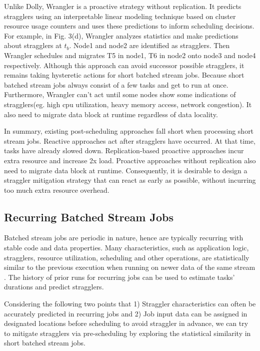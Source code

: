   Unlike Dolly, Wrangler \cite{Yadwadkar2014} is a proactive strategy without replication. It predicts stragglers using an interpretable linear modeling technique based on cluster resource usage counters and uses these predictions to inform scheduling decisions. For example, in Fig. 3(d), Wrangler analyzes statistics and make predictions about stragglers at $t_b$. Node1 and node2 are identified as stragglers. Then Wrangler schedules and migrates T5 in node1, T6 in node2 onto node3 and node4 respectively. Although this approach can avoid successor possible stragglers, it remains taking hysteretic actions for short batched stream jobs. Because short batched stream jobs always consist of a few tasks and get to run at once. Furthermore, Wrangler can't act until some nodes show some indications of stragglers(eg. high cpu utilization, heavy memory access, network congestion). It also need to migrate data block at runtime regardless of data locality.

  In summary, existing post-scheduling approaches fall short when processing short stream jobs. Reactive approaches act after stragglers have occurred. At that time, tasks have already slowed down. Replication-based proactive approaches incur extra resource and increase 2x load. Proactive approaches without replication also need to migrate data block at runtime. Consequently, it is desirable to design a straggler mitigation strategy that can react as early as possible, without incurring too much extra resource overhead.

\subsection{Recurring Batched Stream Jobs}

  Batched stream jobs are periodic in nature, hence are typically recurring with stable code and data properties. Many characteristics, such as application logic, stragglers, resource utilization, scheduling and other operations, are statistically similar to the previous execution when running on newer data of the same stream \cite{Agarwal} \cite{Grandl2016} \cite{Jyothi2016}. The history of prior runs for recurring jobs can be used to estimate tasks' durations and predict stragglers.

  Considering the following two points that 1) Straggler characteristics can often be accurately predicted in recurring jobs and 2) Job input data can be assigned in designated locations before scheduling to avoid straggler in advance, we can try to mitigate stragglers via pre-scheduling by exploring the statistical similarity in short batched stream jobs.

